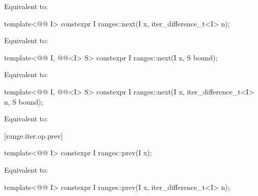 \begin{itemdescr}
\pnum
\effects
Equivalent to: 
\end{itemdescr}

%
\begin{itemdecl}
template<@@ I>
  constexpr I ranges::next(I x, iter_difference_t<I> n);
\end{itemdecl}

\begin{itemdescr}
\pnum
\effects
Equivalent to: 
\end{itemdescr}

%
\begin{itemdecl}
template<@@ I, @@<I> S>
  constexpr I ranges::next(I x, S bound);
\end{itemdecl}

\begin{itemdescr}
\pnum
\effects
Equivalent to: 
\end{itemdescr}

%
\begin{itemdecl}
template<@@ I, @@<I> S>
  constexpr I ranges::next(I x, iter_difference_t<I> n, S bound);
\end{itemdecl}

\begin{itemdescr}
\pnum
\effects
Equivalent to: 
\end{itemdescr}

[range.iter.op.prev]{}
%
\begin{itemdecl}
template<@@ I>
  constexpr I ranges::prev(I x);
\end{itemdecl}

\begin{itemdescr}
\pnum
\effects
Equivalent to: 
\end{itemdescr}

%
\begin{itemdecl}
template<@@ I>
  constexpr I ranges::prev(I x, iter_difference_t<I> n);
\end{itemdecl}

